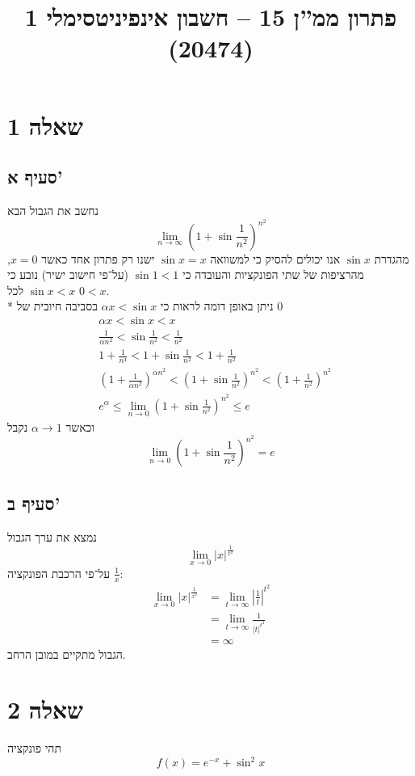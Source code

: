 
\title{פתרון ממ''ן 15 – חשבון אינפיניטסימלי 1 (20474)}


\maketitle
\section{שאלה 1}
\subsection{סעיף א'}
נחשב את הגבול הבא
\[
	\lim_{n \to \infty} {\left( 1 + \sin \frac{1}{n^2} \right)}^{n^2}
\]
מהגדרת $\sin x$ אנו יכולים להסיק כי למשוואה $\sin x = x$ ישנו רק פתרון אחד כאשר $x = 0$,
מהרציפות של שתי הפונקציות והעובדה כי $\sin 1 < 1$ (על־פי חישוב ישיר) נובע כי $\sin x < x$ לכל $0 < x$. \\*
ניתן באופן דומה לראות כי $\alpha x < \sin x$ בסביבה חיובית של $0$
\begin{align*}
	& \alpha x < \sin x < x \\
	& \frac{1}{\alpha n^2} < \sin \frac{1}{n^2} < \frac{1}{n^2} \\
	& 1 + \frac{1}{n^4} < 1 + \sin \frac{1}{n^2} < 1 + \frac{1}{n^2} \\
	& {\left( 1 + \frac{1}{\alpha n^2} \right)}^{\alpha n^2} < {\left( 1 + \sin \frac{1}{n^2} \right)}^{n^2} < {\left(1 + \frac{1}{n^2} \right)}^{n^2} \\
	& e^\alpha \le \lim_{n \to 0} {\left( 1 + \sin \frac{1}{n^2} \right)}^{n^2} \le e
\end{align*}
וכאשר $\alpha \to 1$ נקבל
\[
	\lim_{n \to 0} {\left( 1 + \sin \frac{1}{n^2} \right)}^{n^2} = e
\]

\subsection{סעיף ב'}
נמצא את ערך הגבול
\[
	\lim_{x \to 0} |x|^{\frac{1}{x^2}}
\]
על־פי הרכבת הפונקציה $\frac{1}{x}$:
\begin{align*}
	\lim_{x \to 0} |x|^{\frac{1}{x^2}}
	& = \lim_{t \to \infty} {\left\lvert \frac{1}{t} \right\rvert}^{t^2} \\
	& = \lim_{t \to \infty} \frac{1}{|t|^{t^2} } \\
	& = \infty
\end{align*}
הגבול מתקיים במובן הרחב.

\section{שאלה 2}
תהי פונקציה
\[
	f(x) = e^{-x} + \sin^2 x
\]

